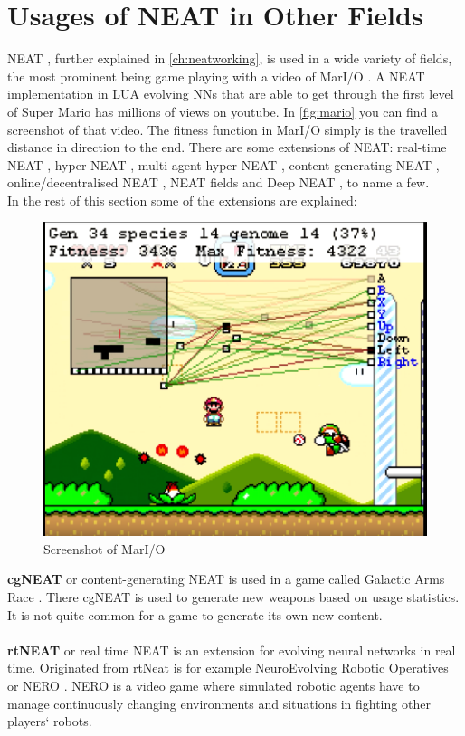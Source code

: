 \section{Usages of NEAT in Other Fields}
\label{sec:rel_genalgo}
NEAT \cite{neat}, further explained in \autoref{ch:neatworking}, is used in a wide variety of fields, the most prominent being game playing with a video of MarI/O \cite{mario} \cite{marioneat}. A NEAT implementation in LUA evolving NNs that are able to get through the first level of Super Mario has millions of views on youtube. In \autoref{fig:mario} you can find a screenshot of that video. The fitness function in MarI/O simply is the travelled distance in direction to the end. There are some extensions of NEAT: real-time NEAT \cite{rtneat}, hyper NEAT \cite{hneat}, multi-agent hyper NEAT \cite{mahneat}, content-generating NEAT \cite{cgneat}, online/decentralised NEAT \cite{odneat}, NEAT fields \cite{neatfields} and Deep NEAT \cite{deepneat}, to name a few. \\
In the rest of this section some of the extensions are explained: \\
\begin{figure}
	\center
	\includegraphics[width=0.8\linewidth]{mario}
	\caption{Screenshot of MarI/O \cite{mario}}
	\label{fig:mario}
\end{figure}
\textbf{cgNEAT} or content-generating NEAT \cite{cgneat} is used in a game called Galactic Arms Race \cite{gar}. There cgNEAT is used to generate new weapons based on usage statistics. It is not quite common for a game to generate its own new content. \\ \\
\textbf{rtNEAT} or real time NEAT \cite{rtneat} is an extension for evolving neural networks in real time. Originated from rtNeat is for example NeuroEvolving Robotic Operatives or NERO \cite{nero}. NERO is a video game where simulated robotic agents have to manage continuously changing environments and situations in fighting other players` robots. \\ \\
